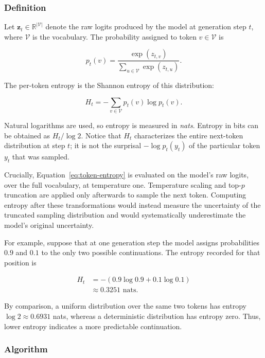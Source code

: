 \documentclass{article}
\begin{document}
\subsubsection{Definition}

Let $\mathbf{z}_t \in \mathbb{R}^{|\mathcal{V}|}$ denote the raw logits
produced by the model at generation step $t$, where $\mathcal{V}$ is the
vocabulary. The probability assigned to token $v \in \mathcal{V}$ is

\begin{equation}
p_t(v)
=
\frac{\exp(z_{t,v})}
{\sum_{u \in \mathcal{V}} \exp(z_{t,u})}.
\end{equation}

The per-token entropy is the Shannon entropy of this distribution:

\begin{equation}
H_t
=
-\sum_{v \in \mathcal{V}} p_t(v)\log p_t(v).
\label{eq:token-entropy}
\end{equation}

Natural logarithms are used, so entropy is measured in \emph{nats}. Entropy
in bits can be obtained as $H_t/\log 2$. Notice that $H_t$ characterizes the
entire next-token distribution at step $t$; it is not the surprisal
$-\log p_t(y_t)$ of the particular token $y_t$ that was sampled.

Crucially, Equation~\ref{eq:token-entropy} is evaluated on the model's raw
logits, over the full vocabulary, at temperature one. Temperature scaling
and top-$p$ truncation are applied only afterwards to sample the next token.
Computing entropy after these transformations would instead measure the
uncertainty of the truncated sampling distribution and would systematically
underestimate the model's original uncertainty.

For example, suppose that at one generation step the model assigns
probabilities $0.9$ and $0.1$ to the only two possible continuations. The
entropy recorded for that position is

\begin{align}
H_t
&=
-\left(0.9\log 0.9 + 0.1\log 0.1\right) \\
&\approx 0.3251 \text{ nats}.
\end{align}

By comparison, a uniform distribution over the same two tokens has entropy
$\log 2 \approx 0.6931$ nats, whereas a deterministic distribution has
entropy zero. Thus, lower entropy indicates a more predictable
continuation.

\subsubsection{Algorithm}
\end{document}
